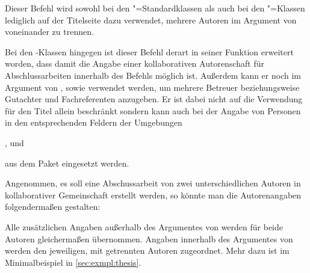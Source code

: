 \begin{Declaration*}{}
\begin{Declaration*}{}
\begin{Declaration*}{}
\begin{Declaration}{}
\printdeclarationlist%
%
%
Dieser Befehl wird sowohl bei den "=Standardklassen als auch bei 
den \KOMAScript"=Klassen lediglich auf der Titelseite dazu verwendet, mehrere 
Autoren im Argument von  voneinander zu trennen.

Bei den \TUDScript-Klassen hingegen ist dieser Befehl derart in seiner Funktion 
erweitert worden, dass damit die Angabe einer kollaborativen Autorenschaft für 
Abschlussarbeiten innerhalb des Befehls  möglich ist. Außerdem 
kann er noch im Argument von ,  sowie 
 verwendet werden, um mehrere Betreuer beziehungsweise Gutachter 
und Fachreferenten anzugeben. Er ist dabei nicht auf die Verwendung für den 
Titel allein beschränkt sondern kann auch bei der Angabe von Personen in den 
entsprechenden Feldern der Umgebungen
\begin{SubDeclaration}{}
,  und 
\end{SubDeclaration}
aus dem Paket  eingesetzt werden.
\end{Declaration}
%
\begin{Example}
Angenommen, es soll eine Abschussarbeit von zwei unterschiedlichen Autoren in 
kollaborativer Gemeinschaft erstellt werden, so könnte man die Autorenangaben 
folgendermaßen gestalten:
\begin{Code}
\author{%
  Mickey Mouse
\and%
  Donald Duck
}
\end{Code}
Alle zusätzlichen Angaben außerhalb des Argumentes von  werden 
für beide Autoren gleichermaßen übernommen. Angaben innerhalb des Argumentes 
von  werden den jeweiligen, mit  getrennten Autoren 
zugeordnet. Mehr dazu ist im Minimalbeispiel in \autoref{sec:exmpl:thesis}.
\end{Example}


\end{Declaration*}
\end{Declaration*}
\end{Declaration*}
